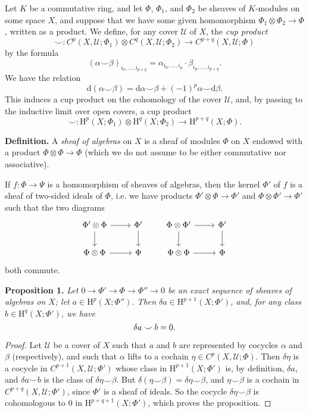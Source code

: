 \documentclass{article}
\newenvironment{itenv}[1]
  {\phantomsection\par\medskip\noindent\textbf{#1.}\itshape}
  {\medskip}
\newenvironment{rmenv}[1]
  {\phantomsection\par\medskip\noindent\textbf{#1.}\rmfamily}
  {\medskip}
\newcommand{\scr}[1]{{\mathscr{#1}}}
\newcommand{\HH}{\mathrm{H}}
\newcommand{\dd}{\mathrm{d}}
\newcommand{\oldpage}[1]{\marginpar{\footnotesize$\Big\vert$ \textit{p.~#1}}}
\begin{document}
Let $K$ be a commutative ring, and let $\Phi$, $\Phi_1$, and $\Phi_2$ be sheaves of $K$-modules on some space $X$, and suppose that we have some given homomorphism $\Phi_1\otimes\Phi_2\to\Phi$, written as a product.
We define, for any cover $\scr{U}$ of $X$, the \emph{cup product}
\[
  \smile\colon C^p(X,\scr{U};\Phi_1) \otimes C^q(X,\scr{U};\Phi_2)
  \to C^{p+q}(X,\scr{U};\Phi)
\]
by the formula
\[
  (\alpha\smile\beta)_{i_0,\ldots,i_{p+q}}
  = \alpha_{i_0,\ldots,i_p}\cdot\beta_{i_p,\ldots,i_{p+q}}.
\]
We have the relation
\[
  \dd(\alpha\smile\beta) = \dd\alpha\smile\beta + (-1)^p\alpha\smile\dd\beta.
\]
This induces a cup product on the cohomology of the cover $\scr{U}$, and, by passing to the inductive limit over open covers, a cup product
\[
  \smile\colon \HH^p(X;\Phi_1) \otimes \HH^q(X;\Phi_2)
  \to \HH^{p+q}(X;\Phi).
\]

\oldpage{4-02}
\begin{rmenv}{Definition}
  A \emph{sheaf of algebras} on $X$ is a sheaf of modules $\Phi$ on $X$ endowed with a product $\Phi\otimes\Phi\to\Phi$ (which we do not assume to be either commutative nor associative).
\end{rmenv}

If $f\colon\Phi\to\Psi$ is a homomorphism of sheaves of algebras, then the kernel $\Phi'$ of $f$ is a sheaf of two-sided ideals of $\Phi$, i.e. we have products $\Phi'\otimes\Phi\to\Phi'$ and $\Phi\otimes\Phi'\to\Phi'$ such that the two diagrams
\[
  \begin{tikzcd}
    \Phi'\otimes\Phi \rar \dar
    & \Phi' \dar
  \\\Phi\otimes\Phi \rar
    & \Phi
  \end{tikzcd}
  \qquad
  \begin{tikzcd}
    \Phi\otimes\Phi' \rar \dar
    & \Phi' \dar
  \\\Phi\otimes\Phi \rar
    & \Phi
  \end{tikzcd}
\]
both commute.

\begin{itenv}{Proposition 1}
\label{proposition1}
  Let $0\to\Phi'\to\Phi\to\Phi''\to0$ be an exact sequence of sheaves of algebras on $X$;
  let $a\in\HH^p(X;\Phi'')$.
  Then $\delta a\in\HH^{p+1}(X;\Phi')$, and, for any class $b\in\HH^q(X;\Phi')$, we have
  \[
    \delta a\smile b=0.\qedhere
  \]
\end{itenv}

\begin{proof}
  Let $\scr{U}$ be a cover of $X$ such that $a$ and $b$ are represented by cocycles $\alpha$ and $\beta$ (respectively), and such that $\alpha$ lifts to a cochain $\eta\in C^p(X,\scr{U};\Phi)$.
  Then $\delta\eta$ is a cocycle in $C^{p+1}(X,\scr{U};\Phi')$ whose class in $\HH^{p+1}(X;\Phi')$ is, by definition, $\delta a$, and $\delta a\smile b$ is the class of $\delta\eta\smile\beta$.
  But $\delta(\eta\smile\beta)=\delta\eta\smile\beta$, and $\eta\smile\beta$ is a cochain in $C^{p+q}(X,\scr{U};\Phi')$, since $\Phi'$ is a sheaf of ideals.
  So the cocycle $\delta\eta\smile\beta$ is cohomologous to $0$ in $\HH^{p+q+1}(X;\Phi')$, which proves the proposition.
\end{proof}
\end{document}
